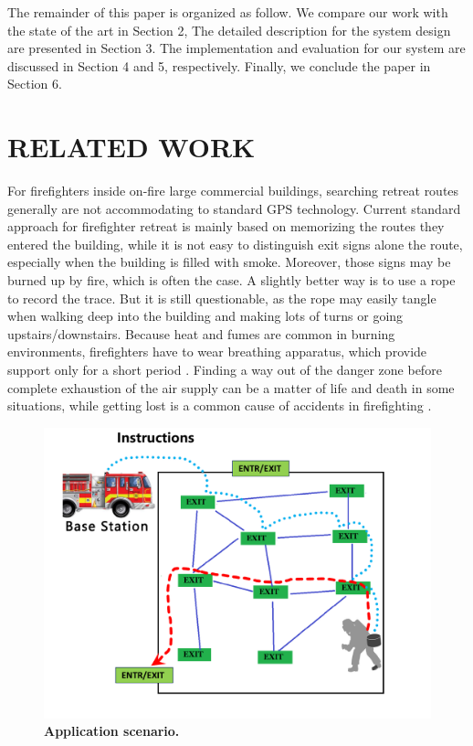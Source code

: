 \documentclass[conference]{IEEEtran}
\begin{document}
The remainder of this paper is organized as follow. We compare our work with the state of the art in Section 2, The detailed description for the system design are presented in Section 3. The implementation and evaluation for our system are discussed in Section 4 and 5, respectively. Finally, we conclude the paper in Section 6.


\section{RELATED WORK}

For firefighters inside on-fire large commercial buildings, searching retreat routes generally are not accommodating to standard GPS technology. Current standard approach for firefighter retreat is mainly based on memorizing the routes they entered the building, while it is not easy to distinguish exit signs alone the route, especially when the building is filled with smoke. Moreover, those signs may be burned up by fire, which is often the case. A slightly better way is to use a rope to record the trace. But it is still questionable, as the rope may easily tangle when walking deep into the building and making lots of turns or going upstairs/downstairs. Because heat and fumes are common in burning environments, firefighters have to wear breathing apparatus, which provide support only for a short period \cite{ramirez2012landmarke}. Finding a way out of the danger zone before complete exhaustion of the air supply can be a matter of life and death in some situations, while getting lost is a common cause of accidents in firefighting \cite{fahy2002us}.

      \begin{figure}[!t]
      \centering
      \includegraphics[width=0.8 \linewidth]{pic/systemdiagram.pdf}
      \caption{\bf Application scenario.}
      \label{fig:exitsign}
      \end{figure}
\end{document}
